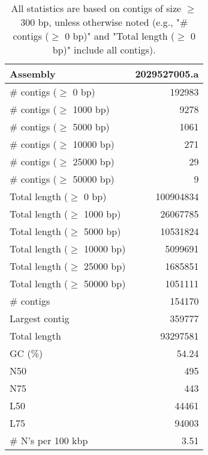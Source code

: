 \documentclass[12pt,a4paper]{article}
\begin{document}
\begin{table}[ht]
\begin{center}
\caption{All statistics are based on contigs of size $\geq$ 300 bp, unless otherwise noted (e.g., "\# contigs ($\geq$ 0 bp)" and "Total length ($\geq$ 0 bp)" include all contigs).}
\begin{tabular}{|l*{1}{|r}|}
\hline
Assembly & 2029527005.a \\ \hline
\# contigs ($\geq$ 0 bp) & 192983 \\ \hline
\# contigs ($\geq$ 1000 bp) & 9278 \\ \hline
\# contigs ($\geq$ 5000 bp) & 1061 \\ \hline
\# contigs ($\geq$ 10000 bp) & 271 \\ \hline
\# contigs ($\geq$ 25000 bp) & 29 \\ \hline
\# contigs ($\geq$ 50000 bp) & 9 \\ \hline
Total length ($\geq$ 0 bp) & 100904834 \\ \hline
Total length ($\geq$ 1000 bp) & 26067785 \\ \hline
Total length ($\geq$ 5000 bp) & 10531824 \\ \hline
Total length ($\geq$ 10000 bp) & 5099691 \\ \hline
Total length ($\geq$ 25000 bp) & 1685851 \\ \hline
Total length ($\geq$ 50000 bp) & 1051111 \\ \hline
\# contigs & 154170 \\ \hline
Largest contig & 359777 \\ \hline
Total length & 93297581 \\ \hline
GC (\%) & 54.24 \\ \hline
N50 & 495 \\ \hline
N75 & 443 \\ \hline
L50 & 44461 \\ \hline
L75 & 94003 \\ \hline
\# N's per 100 kbp & 3.51 \\ \hline
\end{tabular}
\end{center}
\end{table}
\end{document}
